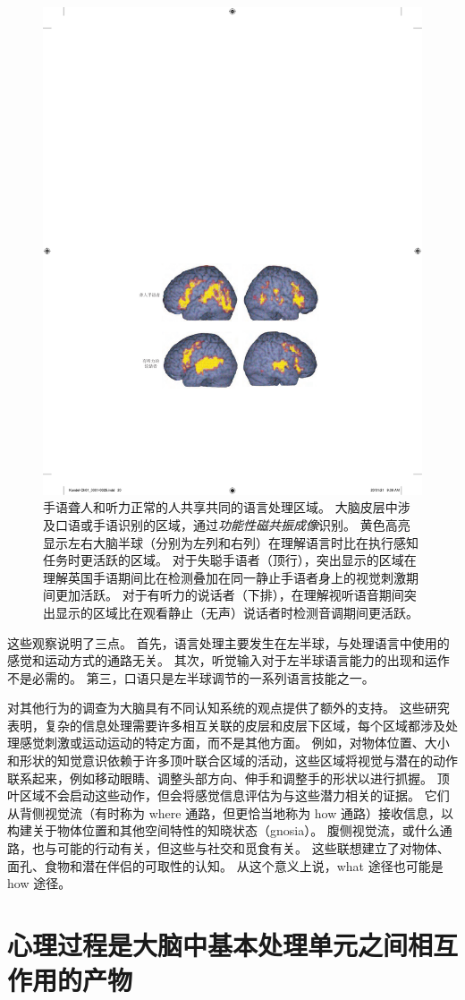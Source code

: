 \begin{figure}[htbp]
	\centering
	\includegraphics[width=0.5\linewidth]{chap01/fig_1_8}
	\caption{手语聋人和听力正常的人共享共同的语言处理区域。
		大脑皮层中涉及口语或手语识别的区域，通过\textit{功能性磁共振成像}识别。
		黄色高亮显示左右大脑半球（分别为左列和右列）在理解语言时比在执行感知任务时更活跃的区域。
		对于失聪手语者（顶行），突出显示的区域在理解英国手语期间比在检测叠加在同一静止手语者身上的视觉刺激期间更加活跃。
		对于有听力的说话者（下排），在理解视听语音期间突出显示的区域比在观看静止（无声）说话者时检测音调期间更活跃\cite{macsweeney2002neural}。}
	\label{fig:1_8}
\end{figure}


这些观察说明了三点。
首先，语言处理主要发生在左半球，与处理语言中使用的感觉和运动方式的通路无关。
其次，听觉输入对于左半球语言能力的出现和运作不是必需的。
第三，口语只是左半球调节的一系列语言技能之一。


对其他行为的调查为大脑具有不同认知系统的观点提供了额外的支持。
这些研究表明，复杂的信息处理需要许多相互关联的皮层和皮层下区域，每个区域都涉及处理感觉刺激或运动运动的特定方面，而不是其他方面。
例如，对物体位置、大小和形状的知觉意识依赖于许多顶叶联合区域的活动，这些区域将视觉与潜在的动作联系起来，例如移动眼睛、调整头部方向、伸手和调整手的形状以进行抓握。
顶叶区域不会启动这些动作，但会将感觉信息评估为与这些潜力相关的证据。
它们从背侧视觉流（有时称为 where 通路，但更恰当地称为 how 通路）接收信息，以构建关于物体位置和其他空间特性的知晓状态（gnosia）。
腹侧视觉流，或什么通路，也与可能的行动有关，但这些与社交和觅食有关。
这些联想建立了对物体、面孔、食物和潜在伴侣的可取性的认知。
从这个意义上说，what 途径也可能是 how 途径。



\section{心理过程是大脑中基本处理单元之间相互作用的产物}

